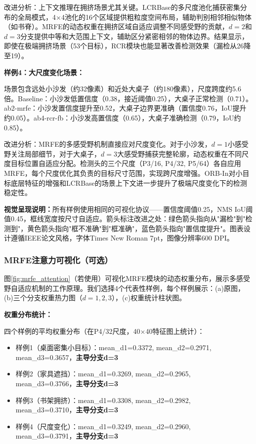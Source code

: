 \documentclass[journal]{IEEEtran}
\begin{document}
改进分析：上下文推理在拥挤场景尤其关键。LCRBase的多尺度池化捕获密集分布的全局模式，4$\times$4池化的16个区域提供粗粒度空间布局，辅助判别相邻相似物体（如书脊）。MRFE的动态权重在拥挤区域自适应调整不同感受野的贡献，$d=2$和$d=3$分支提供中等和大范围上下文，辅助区分紧密相邻的物体边界。结果显示，即使在极端拥挤场景（53个目标），RCR模块也能显著改善检测效果（漏检从26降至19）。

\textbf{样例4：大尺度变化场景：}

场景包含远处小沙发（约32像素）和近处大桌子（约180像素），尺度跨度约5.6倍。Baseline：小沙发低置信度（0.38，接近阈值0.25），大桌子正常检测（0.71）。ab2-mrfe：小沙发置信度提升至0.52，大桌子边界更准确（置信度0.76，IoU提升约0.05）。ab4-rcr-fb：小沙发高置信度（0.65），大桌子准确检测（0.79，IoU约0.85）。

改进分析：MRFE的多感受野机制直接应对尺度变化。对于小沙发，$d=1$小感受野关注局部细节，对于大桌子，$d=3$大感受野捕获完整轮廓，动态权重在不同尺度目标位置自适应分配。检测头的三个尺度（P3/16, P4/32, P5/64）各自应用MRFE，每个尺度优化其负责的目标尺寸范围，实现跨尺度增强。ORB-In对小目标底层特征的增强和LCRBase的场景上下文进一步提升了极端尺度变化下的检测稳定性。

\textbf{视觉呈现说明：}所有样例使用相同的可视化协议——置信度阈值0.25，NMS IoU阈值0.45，框线宽度按尺寸自适应。箭头标注改进之处：绿色箭头指向从"漏检"到"检测到"，黄色箭头指向"框不准确"到"框准确"，蓝色箭头指向"置信度提升"。图表设计遵循IEEE论文风格，字体Times New Roman 7pt，图像分辨率600 DPI。


\subsubsection{MRFE注意力可视化（可选）}

图\ref{fig:mrfe_attention}（若使用）可视化MRFE模块的动态权重分布，展示多感受野自适应机制的工作原理。我们选择4个代表性样例，每个样例展示：(a)原图，(b)三个分支权重热力图（$d=1,2,3$），(c)权重统计柱状图。

\textbf{权重分布统计：}

四个样例的平均权重分布（在P4/32尺度，40$\times$40特征图上统计）：

\begin{itemize}
    \item 样例1（桌面密集小目标）：mean\_d1=0.3372, mean\_d2=0.2971, mean\_d3=0.3657，\textbf{主导分支d=3}
    \item 样例2（家具遮挡）：mean\_d1=0.3269, mean\_d2=0.2965, mean\_d3=0.3766，\textbf{主导分支d=3}
    \item 样例3（书架拥挤）：mean\_d1=0.3308, mean\_d2=0.2982, mean\_d3=0.3710，\textbf{主导分支d=3}
    \item 样例4（尺度变化）：mean\_d1=0.3249, mean\_d2=0.2960, mean\_d3=0.3791，\textbf{主导分支d=3}
\end{itemize}
\end{document}
